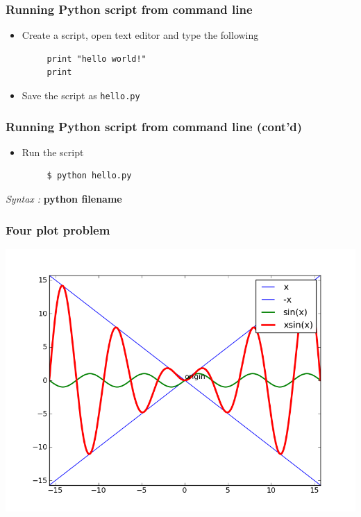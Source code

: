 \documentclass[presentation]{beamer}
\begin{document}
\begin{frame}[fragile]
\frametitle{Running Python script from command line}
\label{sec-4}


\begin{itemize}
\item Create a script, open text editor and type the following
\begin{verbatim}
     print "hello world!"
     print
\end{verbatim}

\item Save the script as \verb~hello.py~
\end{itemize}
\end{frame}
\begin{frame}[fragile]
\frametitle{Running Python script from command line (cont'd)}
\label{sec-5}


\begin{itemize}
\item Run the script
\begin{verbatim}
     $ python hello.py
\end{verbatim}

\end{itemize}
  \emph{Syntax :} \textbf{python filename}
\end{frame}
\begin{frame}
\frametitle{Four plot problem}
\label{sec-6}

    \begin{center}
      \includegraphics[scale=0.4]{four_plot}    
    \end{center}
\end{frame}
\end{document}
